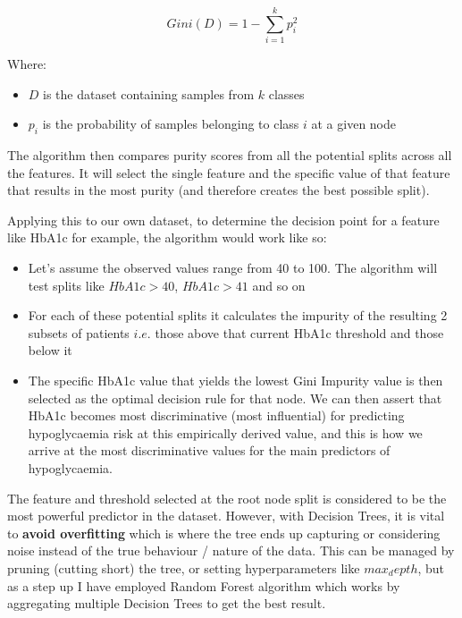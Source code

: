 	$$ Gini(D) = 1 - \sum_{i=1}^{k} p_{i}^2	$$

	\noindent Where: 
	\begin{itemize}
		\item $D$ is the dataset containing samples from $k$ classes 
		\item $p_{i}$ is the probability of samples belonging to class $i$ at a given node
	\end{itemize}
			
	\vspace{5pt}
	\noindent The algorithm then compares purity scores from all the potential splits across all the features. It will select the single feature and the specific value of that feature that results in the most purity (and therefore creates the best possible split). 

	\vspace{5pt}
	\noindent Applying this to our own dataset, to determine the decision point for a feature like HbA1c for example, the algorithm would work like so: 
	\begin{itemize}
		\item Let's assume the observed values range from 40 to 100. The algorithm will test splits like $HbA1c > 40$, $HbA1c > 41$ and so on
		\item For each of these potential splits it calculates the impurity of the resulting 2 subsets of patients $i.e.$ those above that current HbA1c threshold and those below it
		\item The specific HbA1c value that yields the lowest Gini Impurity value is then selected as the optimal decision rule for that node. We can then assert that HbA1c becomes most discriminative (most influential) for predicting hypoglycaemia risk at this empirically derived value, and this is how we arrive at the most discriminative values for the main predictors of hypoglycaemia. 
	\end{itemize}

	\vspace{5pt}
	\noindent The feature and threshold selected at the root node split is considered to be the most powerful predictor in the dataset. However, with Decision Trees, it is vital to \textbf{avoid overfitting} which is where the tree ends up capturing or considering noise instead of the true behaviour / nature of the data. This can be managed by pruning (cutting short) the tree, or setting hyperparameters like $max_depth$, but as a step up I have employed Random Forest algorithm which works by aggregating multiple Decision Trees to get the best result.  

